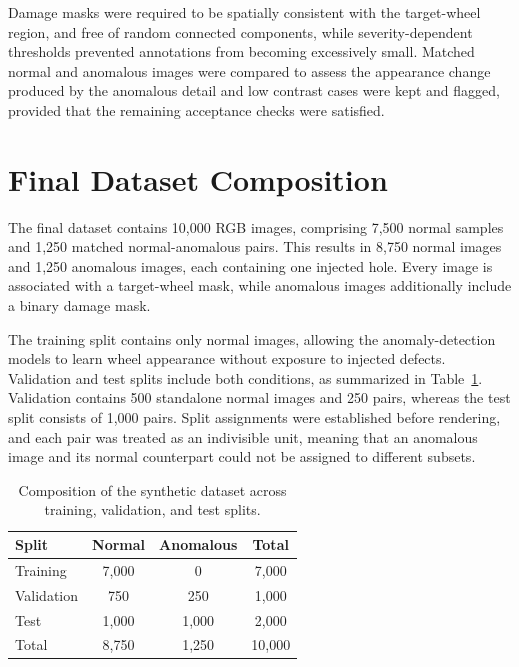 Damage masks were required to be spatially consistent with the target-wheel region, and free of random connected components, while severity-dependent thresholds prevented annotations from becoming excessively small. Matched normal and anomalous images were compared to assess the appearance change produced by the anomalous detail and low contrast cases were kept and flagged, provided that the remaining acceptance checks were satisfied.

\section{Final Dataset Composition}
\label{sec:final-synthetic-dataset}

The final dataset contains 10,000 RGB images, comprising 7,500 normal samples and 1,250 matched normal-anomalous pairs. This results in 8,750 normal images and 1,250 anomalous images, each containing one injected hole. Every image is associated with a target-wheel mask, while anomalous images additionally include a binary damage mask.

The training split contains only normal images, allowing the anomaly-detection models to learn wheel appearance without exposure to injected defects. Validation and test splits include both conditions, as summarized in Table~\ref{tab:synthetic-dataset-splits}. Validation contains 500 standalone normal images and 250 pairs, whereas the test split consists of 1,000 pairs. Split assignments were established before rendering, and each pair was treated as an indivisible unit, meaning that an anomalous image and its normal counterpart could not be assigned to different subsets.

\begin{table}[ht!]
    \centering
    \begin{tabular}{@{}l c c c@{}}
        \toprule
        \textbf{Split} & \textbf{Normal} & \textbf{Anomalous} & \textbf{Total} \\
        \midrule
        \midrule
        Training       & 7,000           & 0                  & 7,000          \\
        Validation     & 750             & 250                & 1,000          \\
        Test           & 1,000           & 1,000              & 2,000          \\
        \midrule
        Total          & 8,750           & 1,250              & 10,000         \\
        \bottomrule
    \end{tabular}
    \vspace{5mm}
    \caption{Composition of the synthetic dataset across training, validation, and test splits.}
    \label{tab:synthetic-dataset-splits}
\end{table}

